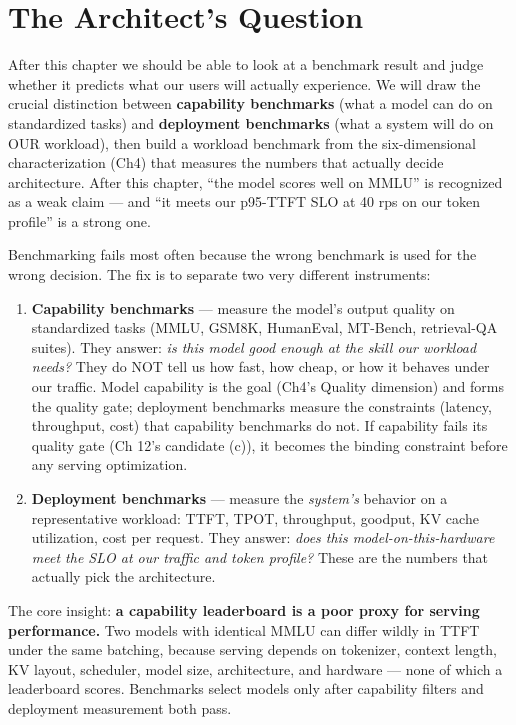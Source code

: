 \section*{The Architect's Question}\label{the-architects-question}

After this chapter we should be able to look at a benchmark result and
judge whether it predicts what our users will actually experience. We
will draw the crucial distinction between \textbf{capability benchmarks}
(what a model can do on standardized tasks) and \textbf{deployment
benchmarks} (what a system will do on OUR workload), then build a
workload benchmark from the six-dimensional characterization (Ch4) that
measures the numbers that actually decide architecture. After this
chapter, ``the model scores well on MMLU'' is recognized as a weak claim
--- and ``it meets our p95-TTFT SLO at 40 rps on our token profile'' is
a strong one.

\label{concept}


Benchmarking fails most often because the wrong benchmark is used for
the wrong decision. The fix is to separate two very different
instruments:

\begin{enumerate}
\def\labelenumi{\arabic{enumi}.}
\item
  \textbf{Capability benchmarks} --- measure the model's output quality
  on standardized tasks (MMLU, GSM8K, HumanEval, MT-Bench, retrieval-QA
  suites). They answer: \emph{is this model good enough at the skill our
  workload needs?} They do NOT tell us how fast, how cheap, or how it
  behaves under our traffic. Model capability is the goal (Ch4's Quality
  dimension) and forms the quality gate; deployment benchmarks measure
  the constraints (latency, throughput, cost) that capability benchmarks
  do not. If capability fails its quality gate (Ch 12's candidate (c)),
  it becomes the binding constraint before any serving optimization.
\item
  \textbf{Deployment benchmarks} --- measure the \emph{system's}
  behavior on a representative workload: TTFT, TPOT, throughput,
  goodput, KV cache utilization, cost per request. They answer:
  \emph{does this model-on-this-hardware meet the SLO at our traffic and
  token profile?} These are the numbers that actually pick the
  architecture.
\end{enumerate}

The core insight: \textbf{a capability leaderboard is a poor proxy for
serving performance.} Two models with identical MMLU can differ wildly
in TTFT under the same batching, because serving depends on tokenizer,
context length, KV layout, scheduler, model size, architecture, and
hardware --- none of which a leaderboard scores. Benchmarks select
models only after capability filters and deployment measurement both
pass.

